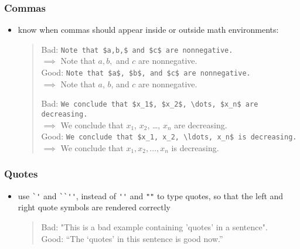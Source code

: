 \documentclass[usepdftitle=false]{beamer}
\begin{document}
\begin{frame}[fragile]
    \frametitle{Commas}

    \begin{itemize}
        \item know when commas should appear inside or outside math environments:
            \begin{quote}
                Bad: \verb+Note that $a,b,$ and $c$ are nonnegative.+\\
                \quad $\implies$ Note that $a,b,$ and $c$ are nonnegative.\\
                Good: \verb+Note that $a$, $b$, and $c$ are nonnegative.+\\
                \quad $\implies$ Note that $a$, $b$, and $c$ are nonnegative.

                Bad: \verb+We conclude that $x_1$, $x_2$, \dots, $x_n$ are decreasing.+\\
                \quad $\implies$ We conclude that $x_1$, $x_2$, \dots, $x_n$ are decreasing.\\
                Good: \verb+We conclude that $x_1, x_2, \ldots, x_n$ is decreasing.+\\
                \quad $\implies$ We conclude that $x_1, x_2, \ldots, x_n$ is decreasing.
            \end{quote}
    \end{itemize}
\end{frame}

\begin{frame}[fragile]
    \frametitle{Quotes}

    \begin{itemize}
        \item use \verb+`'+ and \verb+``''+, instead of \verb+''+ and \verb+""+ to type quotes, so that the left and right quote symbols are rendered correctly
            \begin{quote}
                Bad: "This is a bad example containing 'quotes' in a sentence".\\
                Good: ``The `quotes' in this sentence is good now.''
            \end{quote}
    \end{itemize}
\end{frame}
\end{document}
